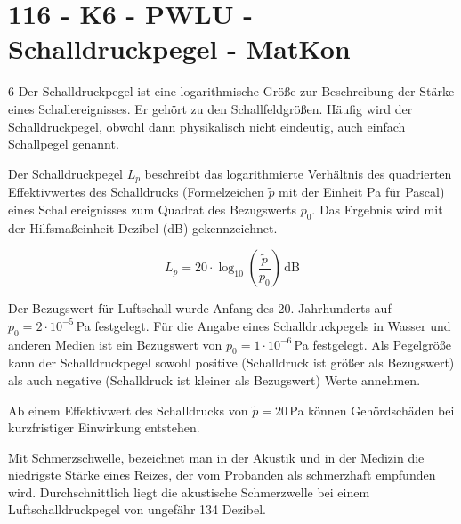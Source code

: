 \section{116 - K6 - PWLU - Schalldruckpegel - MatKon}

\begin{langesbeispiel} \item[6] %
Der Schalldruckpegel ist eine logarithmische Größe zur Beschreibung der Stärke eines Schallereignisses. Er gehört zu den Schallfeldgrößen. Häufig wird der Schalldruckpegel, obwohl dann physikalisch nicht eindeutig, auch einfach Schallpegel genannt.

Der Schalldruckpegel $L_p$ beschreibt das logarithmierte Verhältnis des quadrierten Effektivwertes des Schalldrucks (Formelzeichen $\tilde{p}$ mit der Einheit Pa für Pascal) eines Schallereignisses zum Quadrat des Bezugswerts $p_0$. Das Ergebnis wird mit der Hilfsmaßeinheit Dezibel (dB) gekennzeichnet.

$$L_p=20\cdot\log_{10}\left(\dfrac{\tilde{p}}{p_0}\right)\,\text{dB}$$

Der Bezugswert für Luftschall wurde Anfang des 20. Jahrhunderts auf\\ 
$p_0=2\cdot 10^{-5}$\,Pa festgelegt. Für die Angabe eines Schalldruckpegels in Wasser und anderen Medien ist ein Bezugswert von $p_0=1\cdot 10^{-6}$\,Pa festgelegt. Als Pegelgröße kann der Schalldruckpegel sowohl positive (Schalldruck ist größer als Bezugswert) als auch negative (Schalldruck ist kleiner als Bezugswert) Werte annehmen.%

\begin{aufgabenstellung}
\item  Ab einem Effektivwert des Schalldrucks von $\tilde{p}=20$\,Pa können Gehördschäden bei kurzfristiger Einwirkung entstehen.%


\item Mit Schmerzschwelle, bezeichnet man in der Akustik und in der Medizin die niedrigste Stärke eines Reizes, der vom Probanden als schmerzhaft empfunden wird. Durchschnittlich liegt die akustische Schmerzwelle bei einem Luftschalldruckpegel von ungefähr 134 Dezibel.%


\end{aufgabenstellung}
\end{langesbeispiel}
